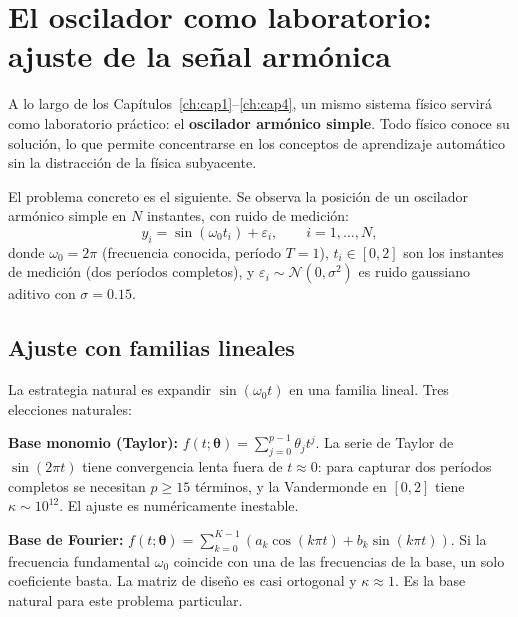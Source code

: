 \section{El oscilador como laboratorio: ajuste de la señal armónica}
\label{sec:oscilador1}


A lo largo de los Capítulos~\ref{ch:cap1}--\ref{ch:cap4}, un mismo sistema
físico servirá como laboratorio práctico: el \textbf{oscilador armónico
simple}. Todo físico conoce su solución, lo que permite concentrarse en
los conceptos de aprendizaje automático sin la distracción de la física
subyacente.

El problema concreto es el siguiente. Se observa la posición de un
oscilador armónico simple en $N$ instantes, con ruido de medición:
\begin{equation}
  y_i = \sin(\omega_0 t_i) + \varepsilon_i,
  \qquad i = 1, \ldots, N,
  \label{eq:oscilador_datos}
\end{equation}
donde $\omega_0 = 2\pi$ (frecuencia conocida, período $T = 1$),
$t_i \in [0, 2]$ son los instantes de medición (dos períodos
completos), y $\varepsilon_i \sim \mathcal{N}(0, \sigma^2)$ es
ruido gaussiano aditivo con $\sigma = 0.15$.

\subsection{Ajuste con familias lineales}
\label{subsec:osc_lineal}

La estrategia natural es expandir $\sin(\omega_0 t)$ en una familia
lineal. Tres elecciones naturales:

\textbf{Base monomio (Taylor):} $f(t;\bm{\theta}) = \sum_{j=0}^{p-1}
\theta_j t^j$. La serie de Taylor de $\sin(2\pi t)$ tiene convergencia
lenta fuera de $t \approx 0$: para capturar dos períodos completos se
necesitan $p \geq 15$ términos, y la Vandermonde en $[0,2]$ tiene
$\kappa \sim 10^{12}$. El ajuste es numéricamente inestable.

\textbf{Base de Fourier:} $f(t;\bm{\theta}) = \sum_{k=0}^{K-1}
(a_k \cos(k\pi t) + b_k \sin(k\pi t))$. Si la frecuencia fundamental
$\omega_0$ coincide con una de las frecuencias de la base, un solo
coeficiente basta. La matriz de diseño es casi ortogonal y
$\kappa \approx 1$. Es la base natural para este problema particular.


